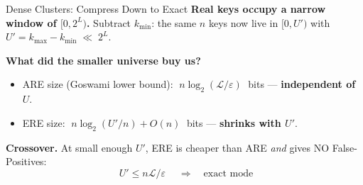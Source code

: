 \begin{frame}{Dense Clusters: Compress Down to Exact}
  \textbf{Real keys occupy a narrow window of $[0, 2^L)$.}
  Subtract $k_{\min}$: the same $n$ keys now live in $[0, U')$ with
  $U' = k_{\max} - k_{\min} \;\ll\; 2^L$.
  \medskip

  \textbf{What did the smaller universe buy us?}
  \begin{itemize}\setlength{\itemsep}{0.4em}
    \item ARE size (Goswami lower bound):
      $\;n \log_2(\mathcal{L}/\varepsilon)\;$ bits --- \textbf{independent of $U$}.
    \item ERE size:
      $\;n \log_2(U'/n) + O(n)\;$ bits --- \textbf{shrinks with $U'$}.
  \end{itemize}
  \medskip

  \textbf{Crossover.} At small enough $U'$, ERE is cheaper than ARE
  \emph{and} gives NO False-Positives:
  \[
    \boxed{\;U' \le n\mathcal{L}/\varepsilon\;}
    \quad\Longrightarrow\quad
    \text{exact mode}
  \]
\end{frame}
